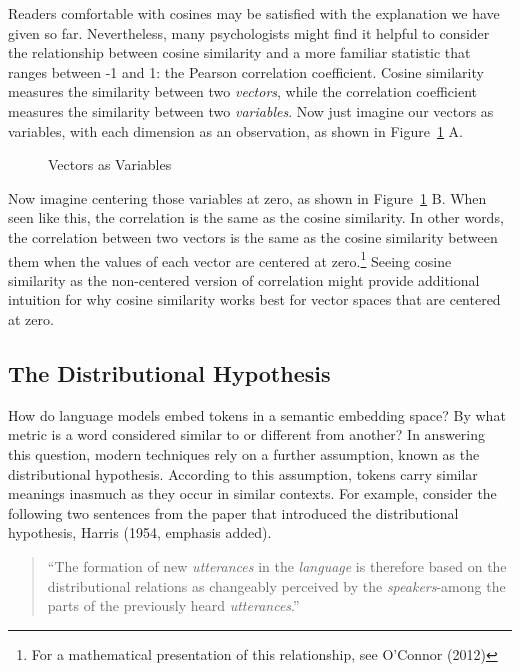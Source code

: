 \documentclass[
  man,
  floatsintext,
  longtable,
  nolmodern,
  notxfonts,
  notimes,
  colorlinks=true,linkcolor=blue,citecolor=blue,urlcolor=blue]{apa7}
\begin{document}
Readers comfortable with cosines may be satisfied with the explanation
we have given so far. Nevertheless, many psychologists might find it
helpful to consider the relationship between cosine similarity and a
more familiar statistic that ranges between -1 and 1: the Pearson
correlation coefficient. Cosine similarity measures the similarity
between two \emph{vectors}, while the correlation coefficient measures
the similarity between two \emph{variables}. Now just imagine our
vectors as variables, with each dimension as an observation, as shown in
Figure~\ref{fig-cosineintuition} A.

\begin{figure}

\caption{\label{fig-cosineintuition}Vectors as Variables}


\end{figure}%

Now imagine centering those variables at zero, as shown in
Figure~\ref{fig-cosineintuition} B. When seen like this, the correlation
is the same as the cosine similarity. In other words, the correlation
between two vectors is the same as the cosine similarity between them
when the values of each vector are centered at zero.\footnote{For a
  mathematical presentation of this relationship, see O'Connor (2012)}
Seeing cosine similarity as the non-centered version of correlation
might provide additional intuition for why cosine similarity works best
for vector spaces that are centered at zero.

\subsection{The Distributional
Hypothesis}\label{the-distributional-hypothesis}

How do language models embed tokens in a semantic embedding space? By
what metric is a word considered similar to or different from another?
In answering this question, modern techniques rely on a further
assumption, known as the distributional hypothesis. According to this
assumption, tokens carry similar meanings inasmuch as they occur in
similar contexts. For example, consider the following two sentences from
the paper that introduced the distributional hypothesis, Harris (1954,
emphasis added).

\begin{quote}
``The formation of new \emph{utterances} in the \emph{language} is
therefore based on the distributional relations as changeably perceived
by the \emph{speakers}-among the parts of the previously heard
\emph{utterances}.''
\end{quote}
\end{document}
